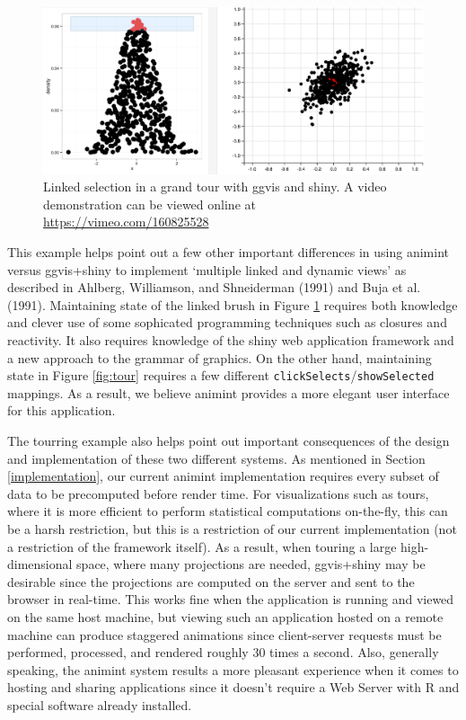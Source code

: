 \documentclass[12pt,]{article}
\theoremstyle{definition}
\theoremstyle{definition}
\theoremstyle{remark}
\begin{document}
\begin{figure}
\centering
\includegraphics{images/tourbrush}
\caption{\label{fig:tourbrush}Linked selection in a grand tour with ggvis
and shiny. A video demonstration can be viewed online at
\url{https://vimeo.com/160825528}}
\end{figure}

This example helps point out a few other important differences in using
animint versus ggvis+shiny to implement `multiple linked and dynamic
views' as described in Ahlberg, Williamson, and Shneiderman (1991) and
Buja et al. (1991). Maintaining state of the linked brush in Figure
\ref{fig:tourbrush} requires both knowledge and clever use of some
sophicated programming techniques such as closures and reactivity. It
also requires knowledge of the shiny web application framework and a new
approach to the grammar of graphics. On the other hand, maintaining
state in Figure \ref{fig:tour} requires a few different
\texttt{clickSelects}/\texttt{showSelected} mappings. As a result, we
believe animint provides a more elegant user interface for this
application.

The tourring example also helps point out important consequences of the
design and implementation of these two different systems. As mentioned
in Section \ref{implementation}, our current animint implementation
requires every subset of data to be precomputed before render time. For
visualizations such as tours, where it is more efficient to perform
statistical computations on-the-fly, this can be a harsh restriction,
but this is a restriction of our current implementation (not a
restriction of the framework itself). As a result, when touring a large
high-dimensional space, where many projections are needed, ggvis+shiny
may be desirable since the projections are computed on the server and
sent to the browser in real-time. This works fine when the application
is running and viewed on the same host machine, but viewing such an
application hosted on a remote machine can produce staggered animations
since client-server requests must be performed, processed, and rendered
roughly 30 times a second. Also, generally speaking, the animint system
results a more pleasant experience when it comes to hosting and sharing
applications since it doesn't require a Web Server with R and special
software already installed.
\end{document}
